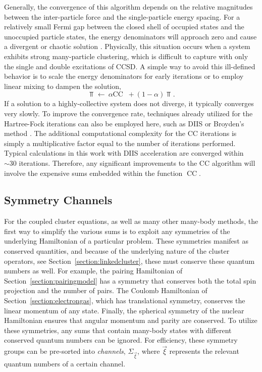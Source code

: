 \documentclass[thesis.tex]{subfiles}
\begin{document}
Generally, the convergence of this algorithm depends on the relative magnitudes between the inter-particle force and the single-particle energy spacing.  For a relatively small Fermi gap between the closed shell of occupied states and the unoccupied particle states, the energy denominators will approach zero and cause a divergent or chaotic solution \cite{SZAKACS2008}.  Physically, this situation occurs when a system exhibits strong many-particle clustering, which is difficult to capture with only the single and double excitations of CCSD.  A simple way to avoid this ill-defined behavior is to scale the energy denominators for early iterations or to employ linear mixing to dampen the solution,
\begin{equation} \label{eq:cc_damping}
  \Top^{\mathop{(n+1)}} \leftarrow\ \alpha\text{CC}\mathop{(\Top^{\mathop{(n)}})} + \left(1 - \alpha\right)\Top^{\mathop{(n)}}.
\end{equation}
If a solution to a highly-collective system does not diverge, it typically converges very slowly.  To improve the convergence rate, techniques already utilized for the Hartree-Fock iterations can also be employed here, such as DIIS \cite{PULAY1980393,PULAY1982556} or Broyden's method \cite{BROYDEN1965557}.  The additional computational complexity for the CC iterations is simply a multiplicative factor equal to the number of iterations performed.  Typical calculations in this work with DIIS acceleration are converged within $\sim 30$ iterations.  Therefore, any significant improvements to the CC algorithm will involve the expensive sums embedded within the function $\text{CC}\mathop{(\Top^{\mathop{(n)}})}$.


\subsection{Symmetry Channels} \label{section:symmetry_channels}

For the coupled cluster equations, as well as many other many-body methods, the first way to simplify the various sums is to exploit any symmetries of the underlying Hamiltonian of a particular problem.  These symmetries manifest as conserved quantities, and because of the underlying nature of the cluster operators, see Section\ \ref{section:linkedcluster}, these must conserve these quantum numbers as well.  For example, the pairing Hamiltonian of Section\ \ref{section:pairingmodel} has a symmetry that conserves both the total spin projection and the number of pairs.  The Coulomb Hamiltonian of Section\ \ref{section:electrongas}, which has translational symmetry, conserves the linear momentum of any state.  Finally, the spherical symmetry of the nuclear Hamiltonian ensures that angular momentum and parity are conserved.  To utilize these symmetries, any sums that contain many-body states with different conserved quantum numbers can be ignored.  For efficiency, these symmetry groups can be pre-sorted into \textit{channels}, $\Sigma_{\vec{\xi}}$, where $\vec{\xi}$ represents the relevant quantum numbers of a certain channel.
\end{document}
